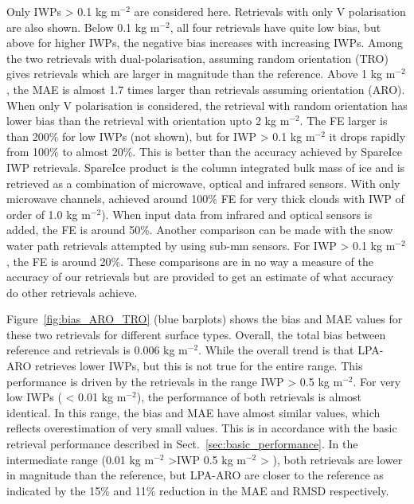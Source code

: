 \documentclass[amt, manuscript]{copernicus}
\begin{document}
Only IWPs > 0.1\,\,kg m$^{-2}$ are considered here. Retrievals with only V polarisation are also shown.  Below 0.1\,\,kg m$^{-2}$, all four retrievals have quite low bias, but above for higher IWPs, the negative bias increases with increasing IWPs. Among the two retrievals with dual-polarisation, assuming random orientation (TRO) gives retrievals which are larger in magnitude than the reference. Above 1\,\,kg m$^{-2}$, the MAE is almost 1.7 times larger than retrievals assuming orientation (ARO). When only V polarisation is considered, the retrieval with random orientation has lower bias than the retrieval with orientation upto 2\,\,kg m$^{-2}$. 
The FE larger is than 200\% for low IWPs (not shown), but for IWP > 0.1\,\,kg m$^{-2}$ it drops rapidly from 100\% to almost 20\%. This is better than the accuracy achieved by SpareIce IWP retrievals. SpareIce product is the column integrated bulk mass of ice and is retrieved as a combination of microwave, optical and infrared sensors. With only microwave channels, \citet{holl:spare:14} achieved around 100\% FE for very thick clouds with IWP of order of 1.0\,\,kg m$^{-2}$). When input data from infrared and optical sensors is added, the FE is around 50\%. Another comparison can be made with the snow water path retrievals attempted by \citet{brath:ismar:18} using sub-mm sensors. For IWP > 0.1\,\,kg m$^{-2}$, the FE is around 20\%. These comparisons are in no way a measure of the accuracy of our retrievals but are provided to get an estimate of what accuracy do other retrievals achieve.

Figure~\ref{fig:bias_ARO_TRO} (blue barplots) shows the bias and MAE values for these two retrievals for different surface types. Overall, the total bias between reference and retrievals is 0.006\,\,kg m$^{-2}$. While the overall trend is that LPA-ARO retrieves lower IWPs, but this is not true for the entire range. This performance is driven by the retrievals in the range IWP > 0.5\,\,kg m$^{-2}$. For very low IWPs ( < 0.01\,\,kg m$^{-2}$), the performance of both retrievals is almost identical. In this range, the bias and MAE have almost similar values, which reflects overestimation of very small values. This is in accordance with the basic retrieval performance described in Sect.~\ref{sec:basic_performance}. In the intermediate range (0.01\,\,kg m$^{-2}$ >IWP 0.5\,\,kg m$^{-2}$ > ), both retrievals are lower in magnitude than the reference, but LPA-ARO are closer to the reference as indicated by the 15\% and 11\% reduction in the MAE and RMSD respectively. 
\end{document}
